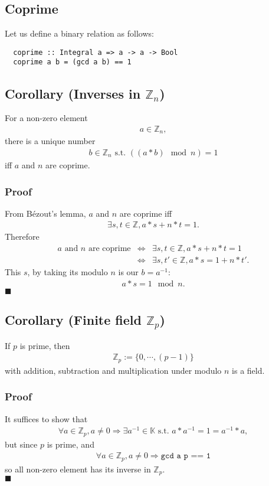 \documentclass[11pt]{book}
\begin{document}
\subsection{Coprime}
Let us define a binary relation as follows:
\begin{verbatim}
  coprime :: Integral a => a -> a -> Bool
  coprime a b = (gcd a b) == 1
\end{verbatim}

\subsection{Corollary (Inverses in $\mathbb{Z}_n$)}
For a non-zero element
\begin{eqnarray}
a \in \mathbb{Z}_n,
\end{eqnarray}
there is a unique number 
\begin{eqnarray}
b \in \mathbb{Z}_n \text{ s.t. } ((a*b) \mod n) = 1
\end{eqnarray}
iff $a$ and $n$ are coprime.

\subsubsection{Proof}
From B\'ezout's lemma, $a$ and $n$ are coprime iff
\begin{eqnarray}
\exists s,t \in \mathbb{Z}, a*s + n*t = 1.
\end{eqnarray}
Therefore
\begin{eqnarray}
\text{$a$ and $n$ are coprime} &\Leftrightarrow& \exists s,t \in \mathbb{Z}, a*s + n*t = 1 \\
&\Leftrightarrow &\exists s,t' \in \mathbb{Z}, a*s = 1 + n*t'.
\end{eqnarray}
This $s$, by taking its modulo $n$ is our $b = a^{-1}$:
\begin{eqnarray}
a*s = 1 \mod n.
\end{eqnarray}
$\blacksquare$

\subsection{Corollary (Finite field $\mathbb{Z}_p$)}
If $p$ is prime, then 
\begin{eqnarray}
\mathbb{Z}_p := \{0, \cdots, (p-1)\}
\end{eqnarray}
with addition, subtraction and multiplication under modulo $n$ is a field.

\subsubsection{Proof}
It suffices to show that 
\begin{eqnarray}
\forall a \in \mathbb{Z}_p, a \neq 0 \Rightarrow \exists a^{-1} \in \mathbb{K} \text{ s.t. } a*a^{-1} = 1 = a^{-1}*a,
\end{eqnarray}
but since $p$ is prime, and
\begin{eqnarray}
\forall a \in \mathbb{Z}_p, a \neq 0 \Rightarrow \texttt{gcd a p == 1}
\end{eqnarray}
so all non-zero element has its inverse in $ \mathbb{Z}_p$.\\
$\blacksquare$
\end{document}
